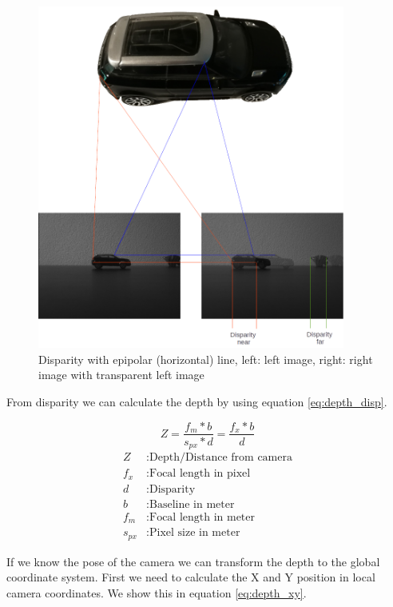 \documentclass[11pt,a4paper,titlepage,oneside]{report}
\begin{document}
\begin{figure}[H]
  \begin{center}
    \includegraphics[width=0.9\textwidth]{img/disparity_concept.png}
  \end{center}
  \caption{Disparity with epipolar (horizontal) line, left: left image, right: right image with transparent left image}\label{fig:disparity}
\end{figure}

From disparity we can calculate the depth by using equation \ref{eq:depth_disp}.

\begin{equation}\label{eq:depth_disp}
  Z=\frac{f_m*b}{s_{px}*d}=\frac{f_x*b}{d}
\end{equation}
\begin{align*}
  Z        &: \text{Depth/Distance from camera}\\
  f_x      &: \text{Focal length in pixel}\\
  d        &: \text{Disparity}\\
  b        &: \text{Baseline in meter}\\
  f_m      &: \text{Focal length in meter}\\
  s_{px}  &: \text{Pixel size in meter}
\end{align*}

If we know the pose of the camera we can transform the depth to the global coordinate system. First we need to calculate the X and Y position in local camera coordinates. We show this in equation \ref{eq:depth_xy}.
\end{document}
